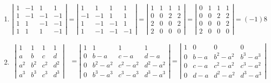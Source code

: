 \documentclass[twoside]{amsart}
\theoremstyle{plain}
\theoremstyle{definition}
\newcommand{\exercisehead}[1]
  {
   \noindent{\small\bf Exercise #1.}
   \smallskip}
\begin{document}
\exercisehead{4}
\begin{enumerate}
\item 
  \[
  \left| \begin{matrix} 1 & -1 & 1 & 1 \\ 1 & -1 & -1 & -1 \\ 1 & 1 & -1 & -1 \\ 1 & 1 & 1 & -1 \end{matrix} \right| = \left| \begin{matrix} 1 & 1 & 1 & 1 \\ -1 & -1 & 1 & 1 \\ 1 & -1 & -1 & 1 \\ 1 & -1 & -1 & -1 \end{matrix} \right| = \left| \begin{matrix} 1 & 1 & 1 & 1 \\ 0 & 0 & 2 & 2 \\ 2 & 0 & 0 & 2 \\ 2 & 0 & 0 & 0 \end{matrix} \right| = \left| \begin{matrix} 0 & 1 & 1 & 1 \\ 0 & 0 & 2 & 2 \\ 0 & 0 & 0 & 2 \\ 2 & 0 & 0 & 0 \end{matrix} \right| = (-1) 8
  \]
\item 
  \[
  \begin{aligned}
    \left| \begin{matrix} 1 & 1 & 1 & 1 \\ a & b & c & d \\ a^2 & b^2 & c^2 & d^2 \\ a^3 & b^3 & c^3 & d^3 \end{matrix} \right| & = \left| \begin{matrix} 1 & 1 & 1 & 1 \\ 0 & b-a & c-a & d-a \\ 0 & b^2 - a^2 & c^2 - a^2 & d^2 -a^2 \\ 0 & b^3 -a^3 & c^3 -a^3 & d^3 - a^3  \end{matrix} \right| = \left| \begin{matrix} 1 & 0 & 0 & 0 \\ 0 & b-a & b^2 -a^2 & b^3 -a^3 \\ 0 & c-a & c^2 - a^2 & c^3 -a^2 \\ 0 & d-a & d^2 -a^2 & d^3 -a^3 \end{matrix} \right|  \\

\end{aligned}\]
\end{enumerate}
\end{document}

